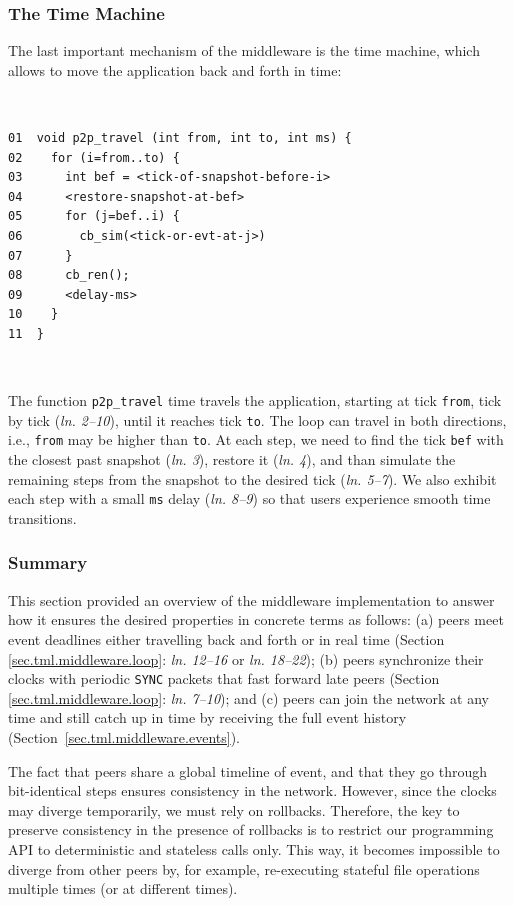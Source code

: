 \documentclass[10pt,journal,compsoc]{IEEEtran}
\newcommand{\code}[1]  {\texttt{\small{#1}}}
\newcommand{\lin}[1]{(\emph{ln. #1}\xspace)}
\newcommand{\linx}[1]{\emph{ln. #1}\xspace}
\begin{document}
\subsubsection{The Time Machine}
\label{sec.tml.middleware.travel}

The last important mechanism of the middleware is the time machine, which
allows to move the application back and forth in time:

{\footnotesize
~
\begin{verbatim}
01  void p2p_travel (int from, int to, int ms) {
02    for (i=from..to) {
03      int bef = <tick-of-snapshot-before-i>
04      <restore-snapshot-at-bef>
05      for (j=bef..i) {
06        cb_sim(<tick-or-evt-at-j>)
07      }
08      cb_ren();
09      <delay-ms>
10    }
11  }
\end{verbatim}
~
}

The function \code{p2p\_travel} time travels the application, starting at tick
\code{from}, tick by tick \lin{2--10}, until it reaches tick \code{to}.
The loop can travel in both directions, i.e., \code{from} may be higher than
\code{to}.
At each step, we need to find the tick \code{bef} with the closest past
snapshot \lin{3}, restore it \lin{4}, and than simulate the remaining steps
from the snapshot to the desired tick \lin{5--7}.
We also exhibit each step with a small \code{ms} delay \lin{8--9} so that users
experience smooth time transitions.

\subsubsection{Summary}
\label{sec.tml.middleware.summary}

This section provided an overview of the middleware implementation to answer
how it ensures the desired properties in concrete terms as follows:
    (a) peers meet event deadlines either travelling back and forth or in real
        time (Section \ref{sec.tml.middleware.loop}: \linx{12--16} or
        \linx{18--22});
    (b) peers synchronize their clocks with periodic \code{SYNC} packets that
        fast forward late peers (Section \ref{sec.tml.middleware.loop}:
        \linx{7--10}); and
    (c) peers can join the network at any time and still catch up in time by
        receiving the full event history
        (Section~\ref{sec.tml.middleware.events}).

The fact that peers share a global timeline of event, and that they go through
bit-identical steps ensures consistency in the network.
However, since the clocks may diverge temporarily, we must rely on rollbacks.
Therefore, the key to preserve consistency in the presence of rollbacks is to
restrict our programming API to deterministic and stateless calls only.
This way, it becomes impossible to diverge from other peers by, for example,
re-executing stateful file operations multiple times (or at different times).
\end{document}
